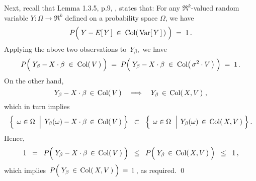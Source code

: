 \vskip 0.3cm
\noindent
Next, recall that Lemma 1.3.5, p.9, \cite{Christensen2011}, states that:
For any $\Re^{k}$-valued random variable $Y : \Omega \longrightarrow \Re^{k}$ defined
on a probability space $\Omega$, we have
\begin{equation*}
	P\!\left(\;Y - E\!\left[\,Y\,\right] \; \overset{{\color{white}.}}{\in} \; \Col\!\left(\,\Var[\,Y\,]\,\right)\;\right) \; = \; 1\,.
\end{equation*}
Applying the above two observations to \,$Y_{\beta}$,\, we have
\begin{equation*}
	P\!\left(\;Y_{\beta} - X\cdot\beta \; \overset{{\color{white}.}}{\in} \; \Col\!\left(\,V\,\right)\;\right)
	\; = \; P\!\left(\;Y_{\beta} - X\cdot\beta \; \overset{{\color{white}.}}{\in} \; \Col\!\left(\,\sigma^{2} \cdot V\,\right)\;\right)
	\; = \; 1\,.
\end{equation*}
On the other hand,
\begin{equation*}
Y_{\beta} - X\cdot\beta \,\in\, \textnormal{Col}\!\left(\,V\,\right)
\quad\Longrightarrow\quad
Y_{\beta} \,\in\, \textnormal{Col}\!\left(\,X,V\,\right)\,,
\end{equation*}
which in turn implies
\begin{equation*}
\left\{\;
	\left.\omega \overset{{\color{white}.}}{\in} \Omega
	\;\;\right\vert\;
	Y_{\beta}(\omega) - X\cdot\beta \,\in\, \Col\!\left(\,V\,\right)
	\;\right\}
\;\;\subset\;\;
\left\{\;
	\left.\omega \overset{{\color{white}.}}{\in} \Omega
	\;\;\right\vert\;
	Y_{\beta}(\omega) \,\in\, \Col\!\left(\,X,V\,\right)\;\right\}.
\end{equation*}
Hence,
\begin{equation*}
1
\;\; = \;\;
P\!\left(\; Y_{\beta} - X\cdot\beta \,\overset{{\color{white}.}}{\in} \, \Col\!\left(\,V\,\right) \;\right)
\;\; \leq \;\;
P\!\left(\; Y_{\beta} \,\overset{{\color{white}.}}{\in} \, \Col\!\left(\,X,V\,\right) \;\right)
\;\; \leq \;\;
1\,,
\end{equation*}
which implies
\,$P\!\left(\; Y_{\beta} \,\overset{{\color{white}.}}{\in} \, \Col\!\left(\,X,V\,\right) \;\right) \,=\, 1$\,, as required.
\qed


